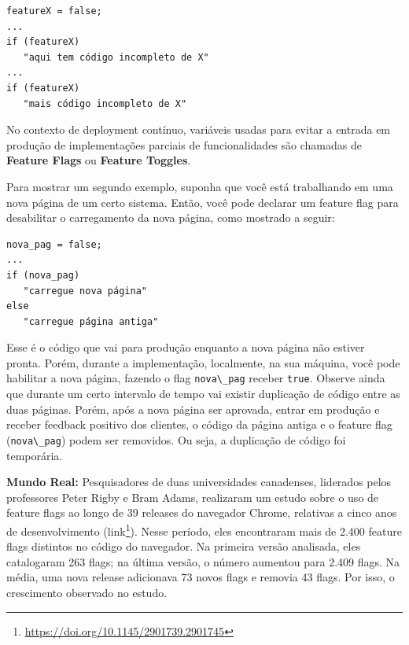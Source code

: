 \documentclass[
  11pt,
  twoside]{book}
\newcommand{\passthrough}[1]{#1}
\DeclareRobustCommand{\href}[2]{#2\footnote{\url{#1}}}
\newenvironment{esmbox}{\centering \vspace{1.5ex} \begin{tcolorbox}[breakable, colback=backcolor, width=4.9in]}{\end{tcolorbox} \vspace{1.5ex}}
\begin{document}
\begin{lstlisting}
featureX = false;
...
if (featureX) 
   "aqui tem código incompleto de X"
...
if (featureX)
   "mais código incompleto de X"
\end{lstlisting}

No contexto de deployment contínuo, variáveis usadas para evitar a
entrada em produção de implementações parciais de funcionalidades são
chamadas de \textbf{Feature Flags} ou \textbf{Feature Toggles}.

Para mostrar um segundo exemplo, suponha que você está trabalhando em
uma nova página de um certo sistema. Então, você pode declarar um
feature flag para desabilitar o carregamento da nova página, como
mostrado a seguir:

\newpage

\begin{lstlisting}
nova_pag = false;
...
if (nova_pag) 
   "carregue nova página"
else
   "carregue página antiga"
\end{lstlisting}

Esse é o código que vai para produção enquanto a nova página não estiver
pronta. Porém, durante a implementação, localmente, na sua máquina, você
pode habilitar a nova página, fazendo o flag
\passthrough{\lstinline!nova\_pag!} receber
\passthrough{\lstinline!true!}. Observe ainda que durante um certo
intervalo de tempo vai existir duplicação de código entre as duas
páginas. Porém, após a nova página ser aprovada, entrar em produção e
receber feedback positivo dos clientes, o código da página antiga e o
feature flag (\passthrough{\lstinline!nova\_pag!}) podem ser removidos.
Ou seja, a duplicação de código foi temporária.


\begin{esmbox}

\textbf{Mundo Real:} Pesquisadores de duas universidades canadenses,
liderados pelos professores Peter Rigby e Bram Adams, realizaram um
estudo sobre o uso de feature flags ao longo de 39 releases do navegador
Chrome, relativas a cinco anos de desenvolvimento
(\href{https://doi.org/10.1145/2901739.2901745}{link}). Nesse período,
eles encontraram mais de 2.400 feature flags distintos no código do
navegador. Na primeira versão analisada, eles catalogaram 263 flags; na
última versão, o número aumentou para 2.409 flags. Na média, uma nova
release adicionava 73 novos flags e removia 43 flags. Por isso, o
crescimento observado no estudo.

\end{esmbox}
\end{document}
